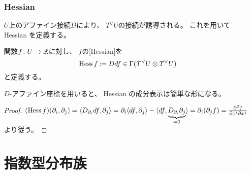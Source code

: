 \documentclass[report]{jlreq}
\begin{document}
\subsection{Hessian}

$U$上のアファイン接続$D$により、
$T^\vee U$の接続が誘導される。
これを用いて Hessian を定義する。

\begin{definition}[Hessian]
    \smooth 関数$f \colon U \to \mathbb{R}$に対し、
    $f$の[Hessian]を
    \begin{equation}
        \operatorname{Hess} f \coloneqq Ddf
            \in \Gamma(T^\vee U \otimes T^\vee U)
    \end{equation}
    と定義する。
\end{definition}

$D$-アファイン座標を用いると、
Hessian の成分表示は簡単な形になる。


\begin{proof}
    $(\operatorname{Hess} f)(\partial_i, \partial_j)
        = \langle D_{\partial_i} df, \partial_j \rangle
        = \partial_i \langle df, \partial_j \rangle
            - \langle
                df,
                \underbrace{D_{\partial_i} \partial_j}_{= 0}
            \rangle
        = \partial_i (\partial_j f)
        = \frac{\partial^2 f}{\partial x^i \partial x^j}$
    より従う。
\end{proof}





%
\chapter{指数型分布族}

%
\end{document}
